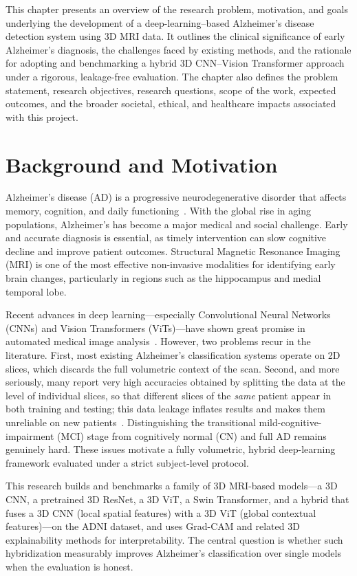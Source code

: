 This chapter presents an overview of the research problem, motivation, and goals underlying the development of a deep-learning–based Alzheimer's disease detection system using 3D MRI data. It outlines the clinical significance of early Alzheimer's diagnosis, the challenges faced by existing methods, and the rationale for adopting and benchmarking a hybrid 3D CNN–Vision Transformer approach under a rigorous, leakage-free evaluation. The chapter also defines the problem statement, research objectives, research questions, scope of the work, expected outcomes, and the broader societal, ethical, and healthcare impacts associated with this project.
\section{Background and Motivation}
Alzheimer's disease (AD) is a progressive neurodegenerative disorder that affects memory, cognition, and daily functioning~\cite{scheltens2016alzheimer}. With the global rise in aging populations, Alzheimer's has become a major medical and social challenge. Early and accurate diagnosis is essential, as timely intervention can slow cognitive decline and improve patient outcomes. Structural Magnetic Resonance Imaging (MRI) is one of the most effective non-invasive modalities for identifying early brain changes, particularly in regions such as the hippocampus and medial temporal lobe.

Recent advances in deep learning—especially Convolutional Neural Networks (CNNs) and Vision Transformers (ViTs)—have shown great promise in automated medical image analysis~\cite{lecun2015deep,litjens2017survey}. However, two problems recur in the literature. First, most existing Alzheimer's classification systems operate on 2D slices, which discards the full volumetric context of the scan. Second, and more seriously, many report very high accuracies obtained by splitting the data at the level of individual slices, so that different slices of the \emph{same} patient appear in both training and testing; this data leakage inflates results and makes them unreliable on new patients~\cite{wen2020convolutional,yagis2021effect}. Distinguishing the transitional mild-cognitive-impairment (MCI) stage from cognitively normal (CN) and full AD remains genuinely hard. These issues motivate a fully volumetric, hybrid deep-learning framework evaluated under a strict subject-level protocol.

This research builds and benchmarks a family of 3D MRI-based models—a 3D CNN, a pretrained 3D ResNet, a 3D ViT, a Swin Transformer, and a hybrid that fuses a 3D CNN (local spatial features) with a 3D ViT (global contextual features)—on the ADNI dataset, and uses Grad-CAM and related 3D explainability methods for interpretability. The central question is whether such hybridization measurably improves Alzheimer's classification over single models when the evaluation is honest.

